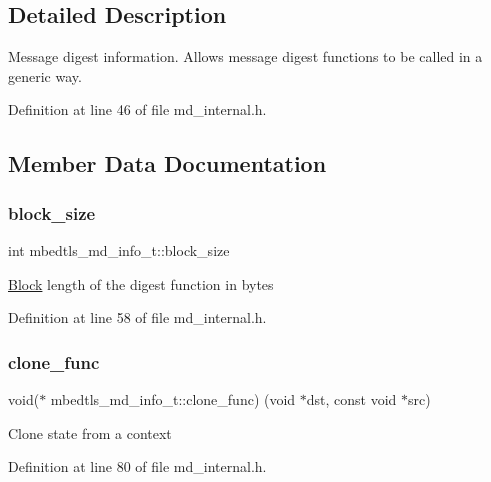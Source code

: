 \subsection{Detailed Description}
Message digest information. Allows message digest functions to be called in a generic way. 

Definition at line 46 of file md\+\_\+internal.\+h.



\subsection{Member Data Documentation}
\mbox{\label{structmbedtls__md__info__t_a2090181c3aef5c7d692147340a6bdf99}} 
\subsubsection{\texorpdfstring{block\+\_\+size}{block\_size}}
{\footnotesize\ttfamily int mbedtls\+\_\+md\+\_\+info\+\_\+t\+::block\+\_\+size}

\mbox{\hyperlink{struct_block}{Block}} length of the digest function in bytes 

Definition at line 58 of file md\+\_\+internal.\+h.

\mbox{\label{structmbedtls__md__info__t_a8cba4e27132e91a692323e4503777543}} 
\subsubsection{\texorpdfstring{clone\+\_\+func}{clone\_func}}
{\footnotesize\ttfamily void($\ast$ mbedtls\+\_\+md\+\_\+info\+\_\+t\+::clone\+\_\+func) (void $\ast$dst, const void $\ast$src)}

Clone state from a context 

Definition at line 80 of file md\+\_\+internal.\+h.

\mbox{\label{structmbedtls__md__info__t_ad14056b534fc7145cfb251c00786c2c0}} 
